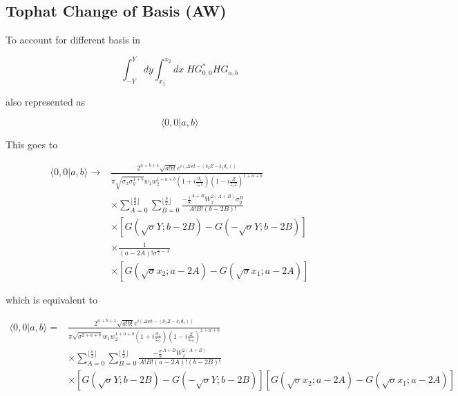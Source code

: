 \documentclass[aps,twoside,secnumarabic,balancelastpage,amsmath,amssymb,nofootinbib,hyperref=pdftex]{revtex4}
\begin{document}
\subsection{Tophat Change of Basis (AW) }

To account for different basis in

\begin{equation*}
	\int_{-Y}^{Y}dy \int_{x_1}^{x_2}
	dx \; HG_{0,0}^*HG_{a,b}
\end{equation*}

also represented as

\begin{equation*}
	\langle 0,0 | a,b \rangle
\end{equation*}

This goes to 

\begin{align*}
	\langle 0,0 | a,b \rangle
	\rightarrow &
	\frac
	{
		2^{a+b+1}
		\sqrt{a!b!}
		e^{i(\Delta w t 
		- (k_2 Z - k_1d_1)
		)}
	}
	{
		\pi \sqrt{\sigma_x \sigma_y^{1+b}}
		w_1 w_2^{1+a+b}
		(1+i \frac{d_1}{z_r1})
		(1-i \frac{Z}{z_r2})^{1+a+b}
	}
	\\& \times
	\sum_{A=0}^{\lfloor{\frac{a}{2}} \rfloor}
	\sum_{B=0}^{\lfloor{\frac{b}{2}} \rfloor}
	\frac
	{
		-\frac{1}{8}^{A+B}
		W_2^{2(A+B)}
		\sigma_y^B		
	}
	{
		A!B!(b-2B)!
	}
	\\& \times
	[
		G(\sqrt{\sigma}Y;b-2B)
		-
		G(-\sqrt{\sigma}Y;b-2B)		
	]
	\\& \times
	\frac{1}{(a-2A)!\sigma^{\frac{a}{2}-A}}
	\\& \times
	[
		G(\sqrt{\sigma}x_2;a-2A)
		-
		G(\sqrt{\sigma}x_1;a-2A)			
	]
\end{align*}

which is equivalent to 

\begin{align*}
 \langle 0,0 | a,b \rangle =&
 	\frac
 	{
 		2^{a+b+1}
 		\sqrt{a!b!}
 		e^{i(\Delta w t 
			- (k_2 Z - k_1d_1)
		)}
 	}
 	{
 		\pi \sqrt{\sigma^{2+a+b}}
 		w_1 w_2^{1+a+b}
 		(1+i \frac{d_1}{z_{r1}})
 		(1-i \frac{Z}{z_{r2}})^{1+a+b}	
 	}
 	\\& \times
		\sum_{A=0}^{\lfloor{\frac{a}{2}} \rfloor}
		\sum_{B=0}^{\lfloor{\frac{b}{2}} \rfloor}
		\frac
		{
			-\frac{\sigma}{8}^{A+B}
			W_2^{2(A+B)}	
		}
		{
			A!B! (a-2A)!(b-2B)!
		}
 	\\& \times
 		[
		G(\sqrt{\sigma}Y;b-2B)
		-
		G(-\sqrt{\sigma}Y;b-2B)		
	]
	[
		G(\sqrt{\sigma}x_2;a-2A)
		-
		G(\sqrt{\sigma}x_1;a-2A)			
	]
\end{align*}
\end{document}
